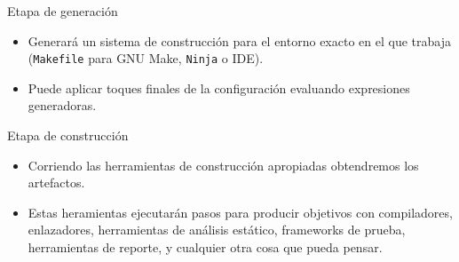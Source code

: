 \begin{frame}
	\begin{block}{Etapa de generación}
		\begin{itemize}
			\item

			Generará un sistema de construcción para el entorno
			exacto en el que trabaja (\lstinline{Makefile} para GNU Make, \lstinline{Ninja} o IDE).

			\item

			Puede aplicar toques finales de la configuración evaluando
			expresiones generadoras.
		\end{itemize}
	\end{block}

	\begin{block}{Etapa de construcción}
		\begin{itemize}
			\item

			Corriendo las herramientas de construcción apropiadas
			obtendremos los artefactos.

			\item

			Estas heramientas ejecutarán pasos para producir objetivos
			con compiladores, enlazadores, herramientas de análisis
			estático, frameworks de prueba, herramientas de reporte,
			y cualquier otra cosa que pueda pensar.
		\end{itemize}
	\end{block}
\end{frame}

